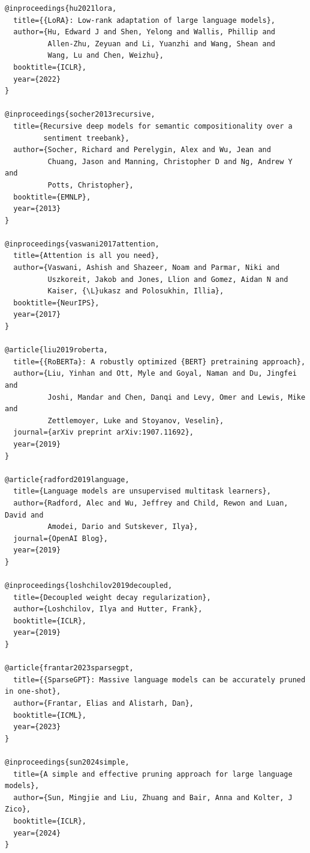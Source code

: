 \begin{lstlisting}
@inproceedings{hu2021lora,
  title={{LoRA}: Low-rank adaptation of large language models},
  author={Hu, Edward J and Shen, Yelong and Wallis, Phillip and 
          Allen-Zhu, Zeyuan and Li, Yuanzhi and Wang, Shean and 
          Wang, Lu and Chen, Weizhu},
  booktitle={ICLR},
  year={2022}
}

@inproceedings{socher2013recursive,
  title={Recursive deep models for semantic compositionality over a 
         sentiment treebank},
  author={Socher, Richard and Perelygin, Alex and Wu, Jean and 
          Chuang, Jason and Manning, Christopher D and Ng, Andrew Y and 
          Potts, Christopher},
  booktitle={EMNLP},
  year={2013}
}

@inproceedings{vaswani2017attention,
  title={Attention is all you need},
  author={Vaswani, Ashish and Shazeer, Noam and Parmar, Niki and 
          Uszkoreit, Jakob and Jones, Llion and Gomez, Aidan N and 
          Kaiser, {\L}ukasz and Polosukhin, Illia},
  booktitle={NeurIPS},
  year={2017}
}

@article{liu2019roberta,
  title={{RoBERTa}: A robustly optimized {BERT} pretraining approach},
  author={Liu, Yinhan and Ott, Myle and Goyal, Naman and Du, Jingfei and 
          Joshi, Mandar and Chen, Danqi and Levy, Omer and Lewis, Mike and 
          Zettlemoyer, Luke and Stoyanov, Veselin},
  journal={arXiv preprint arXiv:1907.11692},
  year={2019}
}

@article{radford2019language,
  title={Language models are unsupervised multitask learners},
  author={Radford, Alec and Wu, Jeffrey and Child, Rewon and Luan, David and 
          Amodei, Dario and Sutskever, Ilya},
  journal={OpenAI Blog},
  year={2019}
}

@inproceedings{loshchilov2019decoupled,
  title={Decoupled weight decay regularization},
  author={Loshchilov, Ilya and Hutter, Frank},
  booktitle={ICLR},
  year={2019}
}

@article{frantar2023sparsegpt,
  title={{SparseGPT}: Massive language models can be accurately pruned in one-shot},
  author={Frantar, Elias and Alistarh, Dan},
  booktitle={ICML},
  year={2023}
}

@inproceedings{sun2024simple,
  title={A simple and effective pruning approach for large language models},
  author={Sun, Mingjie and Liu, Zhuang and Bair, Anna and Kolter, J Zico},
  booktitle={ICLR},
  year={2024}
}
\end{lstlisting}